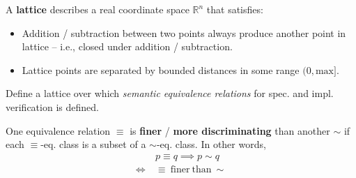 \documentclass[99-notes-packed.tex]{subfiles}
\begin{document}
\begin{background}[lattice]
    A \textbf{lattice} describes a real coordinate space $\mathbb{R}^n$ that satisfies: 
    \begin{itemize}
        \item {
            Addition / subtraction between two points always produce another point in lattice -- i.e., closed under addition / subtraction.
        }
        \item {
            Lattice points are separated by bounded distances in some range $(0, \mathrm{max}]$.
        }
    \end{itemize}
\end{background}

Define a lattice over which \textit{semantic equivalence relations} for spec. and impl. verification is defined.

\begin{definition}
    One equivalence relation $\equiv$ is \textbf{finer} / \textbf{more discriminating} than another $\sim$ if each $\equiv$-eq. class is a subset of a $\sim$-eq. class. In other words,
    \begin{align*}
            \ &p \equiv q \implies p \sim q \\
        \iff\ &\equiv\ \mathrm{finer\ than}\ \sim
    \end{align*}
\end{definition}
\end{document}
